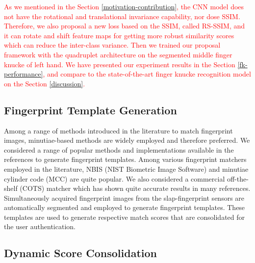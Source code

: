 \textcolor{red}{As we mentioned in the Section \ref{motivation-contribution}, the CNN model does not have the rotational and translational invariance capability, nor dose SSIM. Therefore, we also proposal a new loss based on the SSIM, called RS-SSIM, and it can rotate and shift feature maps for getting more robust similarity scores which can reduce the inter-class variance. Then we trained our proposal framework with the quadruplet architecture \cite{chen2017beyond} on the segmented middle finger knucke of left hand. We have presented our experiment results in the Section \ref{fk-performance}, and compare to the state-of-the-art finger knucke recognition model on the Section \ref{discussion}.}


\subsection{Fingerprint Template Generation\label{fp-template}}

Among a range of methods introduced in the literature \cite{maltoni2009handbook} to match fingerprint images, minutiae-based methods are widely employed and therefore preferred. We considered a range of popular methods and implementations available in the references to generate fingerprint templates. Among various fingerprint matchers employed in the literature, NBIS (NIST Biometric Image Software) \cite{cappelli2010minutia} and minutiae cylinder code (MCC) \cite{watson2007user} are quite popular. We also considered a commercial off-the-shelf (COTS) matcher \cite{verifinger} which has shown quite accurate results in many references. Simultaneously acquired fingerprint images from the slap-fingerprint sensors are automatically segmented and employed to generate fingerprint templates. These templates are used to generate respective match scores that are consolidated for the user authentication. 

\subsection{Dynamic Score Consolidation\label{dynamic-score}}

